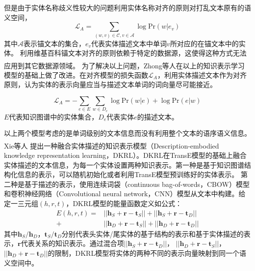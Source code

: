 \documentclass[twocolumn]{article}
\newcommand{\upcite}[1]{\textsuperscript{\textsuperscript{\cite{#1}}}}
\begin{document}
	但是由于实体名称歧义性较大的问题利用实体名称对齐的原则对打乱文本原有的语义空间，
	\begin{equation}
		\mathcal{L}_A=\sum_{(w,v)\in \mathcal{C},v\in \mathcal{A}}\log \text{Pr}(w|e_v)
	\end{equation}
	其中$\mathcal{A}$表示锚文本的集合，$e_v$代表实体描述文本中单词$v$所对应的在锚文本中的实体。
	利用维基百科锚文本对齐的原则依赖于特定的数据源，这使得这种方式无法应用到其它数据源领域。
	为了解决以上问题，Zhong等人\upcite{Zhong}在以上的知识表示学习模型的基础上做了改进。在对齐模型的损失函数$\mathcal{L}_A$，利用实体描述文本作为对齐原则，认为实体的表示向量应当与描述文本单词的词向量尽可能接近。
	
	\begin{equation}
		\mathcal{L}_A=-\sum_{e\in E}\sum_{w\in D_e}\log \text{Pr}(w|e)+\log \text{Pr}(e|w)
	\end{equation}
	$E$代表知识图谱中的实体集合，$D_e$代表实体$e$的描述文本。
	
	以上两个模型考虑的是单词级别的文本信息而没有利用整个文本的语序语义信息。Xie等人\upcite{DKRL}
	提出一种融合实体描述的知识表示模型（Description-embodied knowledge representation learning，DKRL）。DKRL在TransE模型的基础上融合实体描述的文本信息，为每一个实体设置两种知识表示。第一种是基于知识图谱结构化信息的表示，可以随机初始化或者利用TransE模型预训练好的实体表示。
	第二种是基于描述的表示，使用连续词袋（continuous bag-of-words，CBOW）模型和卷积神经网络（Convolutional neural network，CNN）模型从文本中构建。给定一三元组$(h,r,t)$，DKRL模型的能量函数定义如公式：
	\begin{equation}
		\begin{split}
			E(h,r,t)=&||\textbf{h}_S+\textbf{r}-\textbf{t}_S||+||\textbf{h}_S+\textbf{r}-\textbf{t}_D|| \\ 
			+&||\textbf{h}_D+\textbf{r}-\textbf{t}_S||+||\textbf{h}_D+\textbf{r}-\textbf{t}_D||
		\end{split}
	\end{equation}
	其中$\textbf{h}_S/\textbf{h}_D，\textbf{t}_S/\textbf{t}_D$分别代表头实体/尾实体的基于结构的表示和基于实体描述的表示，$\textbf{r}$代表关系的知识表示。通过混合项$||\textbf{h}_S+\textbf{r}-\textbf{t}_D||$，
	$||\textbf{h}_D+\textbf{r}-\textbf{t}_S||$，$||\textbf{h}_D+\textbf{r}-\textbf{t}_D||$的限制，DKRL模型将实体的两种不同的表示向量映射到同一个语义空间中。
	
\end{document}
